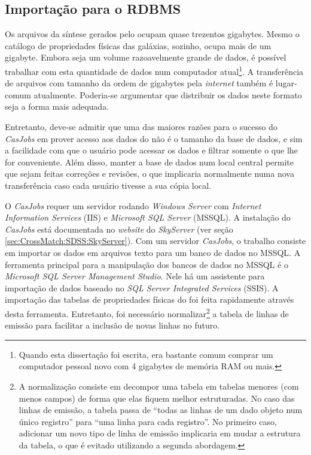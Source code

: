 \subsection{Importação para o RDBMS}

Os arquivos da síntese gerados pelo \starlight ocupam quase trezentos gigabytes.
Mesmo o catálogo de propriedades físicas das galáxias, sozinho, ocupa mais de um
gigabyte. Embora seja um volume razoavelmente grande de dados, é possível
trabalhar com esta quantidade de dados num computador atual\footnote{Quando esta
dissertação foi escrita, era bastante comum comprar um computador pessoal novo
com 4 gigabytes de memória RAM ou mais.}. A transferência de arquivos com
tamanho da ordem de gigabytes pela {\em internet} também é lugar-comum
atualmente. Poderia-se argumentar que distribuir os dados neste formato seja a
forma mais adequada.

Entretanto, deve-se admitir que uma das maiores razões para o sucesso do {\em
CasJobs} em prover acesso aos dados do \SDSS não é o tamanho da base de dados, e
sim a facilidade com que o usuário pode acessar os dados e filtrar somente o que
lhe for conveniente. Além disso, manter a base de dados num local central
permite que sejam feitas correções e revisões, o que implicaria normalmente numa
nova transferência caso cada usuário tivesse a sua cópia local.

O {\em CasJobs} requer um servidor rodando {\em Windows Server} com {\em
Internet Information Services} (IIS) e {\em Microsoft SQL Server} (MSSQL). A
instalação do {\em CasJobs} está documentada no {\em website} do {\em SkyServer}
(ver seção \ref{sec:CrossMatch:SDSS:SkyServer}). Com um servidor {\em CasJobs},
o trabalho consiste em importar os dados em arquivos texto para um banco de
dados no MSSQL. A ferramenta principal para a manipulação dos bancos de dados no
MSSQL é o {\em Microsoft SQL Server Management Studio}. Nele há um assistente
para importação de dados baseado no {\em SQL Server Integrated Services} (SSIS).
A importação das tabelas de propriedades físicas do \starlight foi feita
rapidamente através desta ferramenta. Entretanto, foi necessário
normalizar\footnote{A normalização consiste em decompor uma tabela em tabelas
menores (com menos campos) de forma que elas fiquem melhor estruturadas. No caso
das linhas de emissão, a tabela passa de ``todas as linhas de um dado objeto num
único registro'' para ``uma linha para cada registro''. No primeiro caso,
adicionar um novo tipo de linha de emissão implicaria em mudar a estrutura da
tabela, o que é evitado utilizando a segunda abordagem.} a tabela de linhas de
emissão para facilitar a inclusão de novas linhas no futuro.

